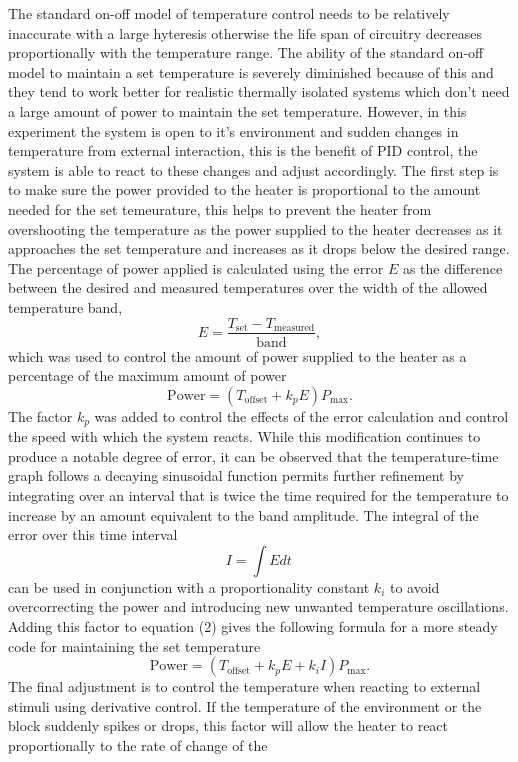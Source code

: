 \documentclass[11pt]{article}
\begin{document}
    The standard on-off model of temperature control needs to be relatively
inaccurate with a large hyteresis otherwise the life span of circuitry
decreases proportionally with the temperature range. The ability of the
standard on-off model to maintain a set temperature is severely
diminished because of this and they tend to work better for realistic
thermally isolated systems which don't need a large amount of power to
maintain the set temperature. However, in this experiment the system is
open to it's environment and sudden changes in temperature from external
interaction, this is the benefit of PID control, the system is able to
react to these changes and adjust accordingly. The first step is to make
sure the power provided to the heater is proportional to the amount
needed for the set temeurature, this helps to prevent the heater from
overshooting the temperature as the power supplied to the heater
decreases as it approaches the set temperature and increases as it drops
below the desired range. The percentage of power applied is calculated
using the error \(E\) as the difference between the desired and measured
temperatures over the width of the allowed temperature band,
\[E = \frac{T_{\text{set}} - T_{\text{measured}}}{\text{band}}, \tag{1}\]
which was used to control the amount of power supplied to the heater as
a percentage of the maximum amount of power
\[ \text{Power} = ( T_{\text{offset}} + k_p E ) P_{\text{max}}. \tag{2}\]
The factor \(k_p\) was added to control the effects of the error
calculation and control the speed with which the system reacts. While
this modification continues to produce a notable degree of error, it can
be observed that the temperature-time graph follows a decaying
sinusoidal function permits further refinement by integrating over an
interval that is twice the time required for the temperature to increase
by an amount equivalent to the band amplitude. The integral of the error
over this time interval \[I = \int {E } dt\, \tag{3}\] can be used in
conjunction with a proportionality constant \(k_i\) to avoid
overcorrecting the power and introducing new unwanted temperature
oscillations. Adding this factor to equation (2) gives the following
formula for a more steady code for maintaining the set temperature
\[\text{Power} = ( T_{\text{offset}} + k_p E + k_i I) P_{\text{max}}. \tag{4}\]
The final adjustment is to control the temperature when reacting to
external stimuli using derivative control. If the temperature of the
environment or the block suddenly spikes or drops, this factor will
allow the heater to react proportionally to the rate of change of the
\end{document}
